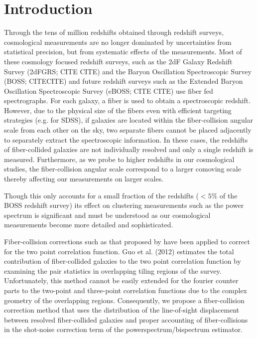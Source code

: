 \documentclass{emulateapj}
\begin{document}
\section{Introduction} 
Through the tens of million redshifts obtained through redshift surveys, cosmological measurements are no longer dominated by uncertainties from statistical precision, but from systematic effects of the measurements. Most of these cosmology focused redshift surveys, such as the 2dF Galaxy Redshift Survey (2dFGRS; CITE CITE) and the Baryon Oscillation Spectroscopic Survey (BOSS; CITECITE) and future redshift surveys such as the Extended Baryon Oscillation Spectroscopic Survey (eBOSS; CITE CITE) use fiber fed spectrographs. For each galaxy, a fiber is used to obtain a spectroscopic redshift. However, due to the physical size of the fibers even with efficient targeting strategies (e.g. \citealt{Blanton:2003ab} for SDSS), if galaxies are located within the fiber-collision angular scale from each other on the sky, two separate fibers cannot be placed adjacently to separately extract the spectroscopic information. In these cases, the redshifts of fiber-collided galaxies are not individually resolved and only a single redshift is measured. Furthermore, as we probe to higher redshifts in our cosmological studies, the fiber-collision angular scale correspond to a larger comoving scale thereby affecting our measurements on larger scales. 

Though this only accounts for a small fraction of the redshifts ($< 5\%$ of the BOSS redshift survey) its effect on clustering measurements such as the power spectrum is significant and must be understood as our cosmological measurements become more detailed and sophisticated. 

Fiber-collision corrections such as that proposed by \cite{Guo:2012aa} have been applied to correct for the two point correlation function. Guo et al. (2012) estimates the total contribution of fiber-collided galaxies to the two point correlation function by examining the pair statistics in overlapping tiling regions of the survey. Unfortunately, this method cannot be easily extended for the fourier counter parts to the two-point and three-point correlation functions due to the complex geometry of the overlapping regions. Consequently, we propose a fiber-collision correction method that uses the distribution of the line-of-sight displacement between resolved fiber-collided galaxies and proper accounting of fiber-collisions in the shot-noise correction term of the powerspectrum/bispectrum estimator. 
 
\end{document}
